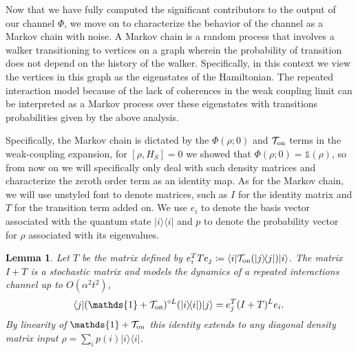 \documentclass{article}
\newtheorem{lemma}[theorem]{Lemma}
\newcommand{\on}{\rm on}
\newcommand{\ket}[1]{|#1\rangle}
\newcommand{\bra}[1]{\langle #1|}
\newcommand{\ketbra}[2]{| #1\rangle\! \langle #2|}
\newcommand{\bigo}[1]{O\left(#1\right)}
\newcommand{\identity}{\mathds{1}}
\begin{document}
Now that we have fully computed the significant contributors to the output of our channel $\Phi$, we move on to characterize the behavior of the channel as a Markov chain with noise. 
A Markov chain is a random process that involves a walker transitioning to vertices on a graph wherein the probability of transition does not depend on the history of the walker.  Specifically, in this context we view the vertices in this graph as the eigenstates of the Hamiltonian.  The repeated interaction model because of the lack of coherences in the weak coupling limit can be interpreted as a Markov process over these eigenstates with transitions probabilities given by the above analysis. 

Specifically, the Markov chain is dictated by the $\Phi(\rho; 0)$ and $\mathcal{T}_{\on}$ terms in the weak-coupling expansion, for $[\rho, H_S] = 0$ we showed that $\Phi(\rho; 0) = \identity(\rho)$, so from now on we will specifically only deal with such density matrices and characterize the zeroth order term as an identity map. As for the Markov chain, we will use unstyled font to denote matrices, such as $I$ for the identity matrix and $T$ for the transition term added on. We use $e_i$ to denote the basis vector associated with the quantum state $\ketbra{i}{i}$ and $p$ to denote the probability vector for $\rho$ associated with its eigenvalues.
\begin{lemma} \label{lem:quantum_to_classical}
    Let $T$ be the matrix defined by $e_i^T T e_j \coloneqq \bra{i} \mathcal{T}_{\on}(\ketbra{j}{j}) \ket{i}$. The matrix $I + T$ is a stochastic matrix and models the dynamics of a repeated interactions channel up to $\bigo{\alpha^2 t^2}$,
    \begin{equation}
        \bra{j} (\identity + \mathcal{T}_{\on})^{\circ L} (\ketbra{i}{i}) \ket{j} = e_j^T (I + T)^L e_i.
    \end{equation}
    By linearity of $\identity + \mathcal{T}_{\on}$ this identity extends to any diagonal density matrix input $\rho = \sum_i p(i) \ketbra{i}{i}$.
\end{lemma}
\end{document}
